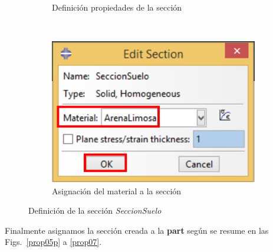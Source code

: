 \begin{figure}
\begin{subfigure}[!h]{0.39\textwidth}
      \caption{Definición propiedades de la sección}
      \label{prop04}
    \end{subfigure}%
    ~ %
    \begin{subfigure}[!h]{0.39\textwidth}
      \includegraphics[width=\textwidth]{./body/images/prop05.pdf}
      \caption{Asignación del material a la sección}
      \label{prop05}
    \end{subfigure}%
    \caption{Definición de la sección \textit{SeccionSuelo}}
  \end{figure}

  Finalmente asignamos la sección creada a la \textbf{part} según se
  resume en las Figs.~\ref{prop05p} a \ref{prop07}.

